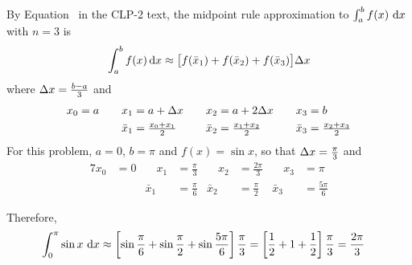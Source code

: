 \begin{solution}
By Equation~ in the CLP-2 text,
the midpoint rule approximation
to $\int_a^b f(x)\ \mathrm{d}x$ with $n=3$ is
\begin{align*}
\int_a^b f(x)\,\mathrm{d}x\approx\big[f(\bar x_1)+f(\bar x_2)+f(\bar x_3)\big]\Delta x
\end{align*}
where $\Delta x = \tfrac{b-a}{3}$ and
\begin{alignat*}{7}
x_0&=a&\quad
x_1&=a+\Delta x&\quad
x_2&=a+2\Delta x&\quad
x_3&=b\\
& &
\bar x_1&=\tfrac{x_0+x_1}{2}&
\bar x_2&=\tfrac{x_1+x_2}{2}&
\bar x_3&=\tfrac{x_2+x_3}{2}
\end{alignat*}
For this problem, $a=0$, $b=\pi$ and $f(x) = \sin x$, so that
$\Delta x = \tfrac{\pi}{3}$  and
\begin{alignat*}{7}
x_0&=0&\quad
x_1&=\tfrac{\pi}{3}&\quad
x_2&=\tfrac{2\pi}{3}&\quad
x_3&=\pi\\
& &
\bar x_1&=\tfrac{\pi}{6}&
\bar x_2&=\tfrac{\pi}{2}&
\bar x_3&=\tfrac{5\pi}{6}
\end{alignat*}



  \begin{center}
  \end{center}


Therefore,
\begin{align*}
\int_0^\pi \sin x\ \mathrm{d}x
&\approx\left[\sin\frac{\pi}{6}
            +\sin \frac{\pi}{2}
            +\sin \frac{5\pi}{6}\right]\frac{\pi}{3}
=\left[\frac{1}{2}
            +1
            +\frac{1}{2}\right]\frac{\pi}{3}
=\frac{2\pi}{3}
\end{align*}

\end{solution}


